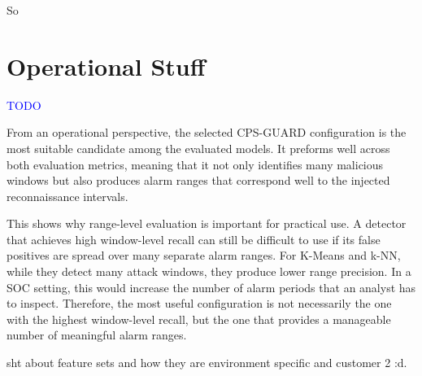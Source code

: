 So


\section{Operational Stuff}
\textcolor{blue}{TODO}

From an operational perspective, the selected CPS-GUARD configuration is the most suitable candidate among the evaluated models. It preforms well across both evaluation metrics, meaning that it not only identifies many malicious windows but also produces alarm ranges that correspond well to the injected reconnaissance intervals. 

This shows why range-level evaluation is important for practical use. A detector that achieves high window-level recall can still be difficult to use if its false positives are spread over many separate alarm ranges. For K-Means and k-NN, while they detect many attack windows, they produce lower range precision. In a SOC setting, this would increase the number of alarm periods that an analyst has to inspect. Therefore, the most useful configuration is not necessarily the one with the highest window-level recall, but the one that provides a manageable number of meaningful alarm ranges.

sht about feature sets and how they are environment specific and customer 2 :d.








